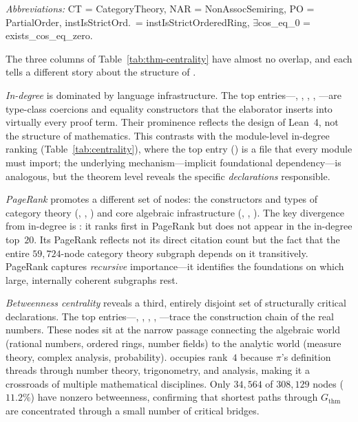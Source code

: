 \noindent
\textit{Abbreviations:} CT = CategoryTheory, NAR = NonAssocSemiring, PO = PartialOrder, instIsStrictOrd.\ = instIsStrictOrderedRing, $\exists$cos\_eq\_0 = exists\_cos\_eq\_zero.

\medskip

The three columns of Table~\ref{tab:thm-centrality} have almost no overlap, and each tells a different story about the structure of .

\emph{In-degree} is dominated by language infrastructure. The top entries---, , , , ---are type-class coercions and equality constructors that the elaborator inserts into virtually every proof term. Their prominence reflects the design of Lean~4, not the structure of mathematics. This contrasts with the module-level in-degree ranking (Table~\ref{tab:centrality}), where the top entry () is a file that every module must import; the underlying mechanism---implicit foundational dependency---is analogous, but the theorem level reveals the specific \emph{declarations} responsible.

\emph{PageRank} promotes a different set of nodes: the constructors and types of category theory (, , ) and core algebraic infrastructure (, , ). The key divergence from in-degree is : it ranks first in PageRank but does not appear in the in-degree top~$20$. Its PageRank reflects not its direct citation count but the fact that the entire $59{,}724$-node category theory subgraph depends on it transitively. PageRank captures \emph{recursive} importance---it identifies the foundations on which large, internally coherent subgraphs rest.

\emph{Betweenness centrality} reveals a third, entirely disjoint set of structurally critical declarations. The top entries---, , , , ---trace the construction chain of the real numbers. These nodes sit at the narrow passage connecting the algebraic world (rational numbers, ordered rings, number fields) to the analytic world (measure theory, complex analysis, probability).  occupies rank~$4$ because $\pi$'s definition threads through number theory, trigonometry, and analysis, making it a crossroads of multiple mathematical disciplines. Only $34{,}564$ of $308{,}129$ nodes ($11.2\%$) have nonzero betweenness, confirming that shortest paths through $G_{\mathrm{thm}}$ are concentrated through a small number of critical bridges.

